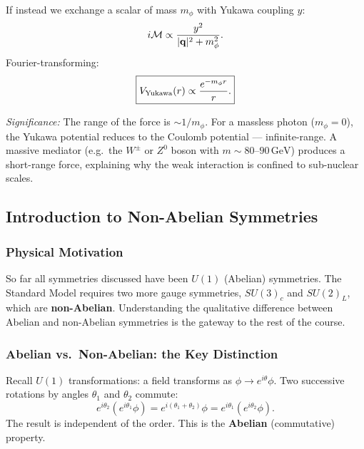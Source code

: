 \documentclass[../main.tex]{subfiles}
\begin{document}
If instead we exchange a scalar of mass $m_\phi$ with Yukawa coupling $y$:
\begin{equation}
  i\mathcal{M} \propto \frac{y^2}{|\mathbf{q}|^2 + m_\phi^2}.
  \label{eq:lec12:scalaramp}
\end{equation}
Fourier-transforming:
\begin{equation}
  \boxed{V_{\rm Yukawa}(r) \propto \frac{e^{-m_\phi r}}{r}.}
  \label{eq:lec12:yukawa}
\end{equation}

\textit{Significance:} The range of the force is $\sim 1/m_\phi$.  For a massless photon ($m_\phi=0$), the Yukawa potential reduces to the Coulomb potential — infinite-range.  A massive mediator (e.g.\ the $W^\pm$ or $Z^0$ boson with $m\sim 80$--$90\,\text{GeV}$) produces a short-range force, explaining why the weak interaction is confined to sub-nuclear scales.

\subsection*{Introduction to Non-Abelian Symmetries}\label{sec:lec12:nonabelian}

\subsubsection*{Physical Motivation}

So far all symmetries discussed have been $U(1)$ (Abelian) symmetries.  The Standard Model requires two more gauge symmetries, $SU(3)_c$ and $SU(2)_L$, which are \textbf{non-Abelian}.  Understanding the qualitative difference between Abelian and non-Abelian symmetries is the gateway to the rest of the course.

\subsubsection*{Abelian vs.\ Non-Abelian: the Key Distinction}

Recall $U(1)$ transformations: a field transforms as $\phi\to e^{i\theta}\phi$.  Two successive rotations by angles $\theta_1$ and $\theta_2$ commute:
\begin{equation}
  e^{i\theta_2}\!\left(e^{i\theta_1}\phi\right)
  = e^{i(\theta_1+\theta_2)}\phi
  = e^{i\theta_1}\!\left(e^{i\theta_2}\phi\right).
  \label{eq:lec12:abelian}
\end{equation}
The result is independent of the order.  This is the \textbf{Abelian} (commutative) property.
\end{document}

